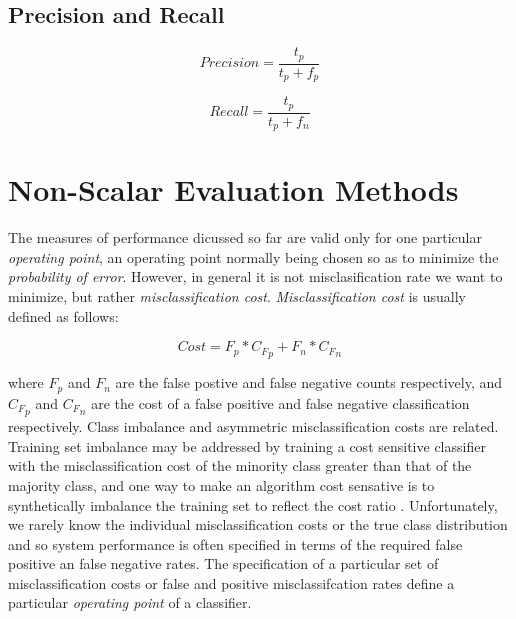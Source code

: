 \documentclass[10pt]{unbthesis}
\begin{document}
\subsection*{Precision and Recall}

\begin{equation}
\label{equ:precision}
Precision = \frac{t_p}{t_p + f_p}
\end{equation}


\begin{equation}
\label{equ:recall}
Recall = \frac{t_p}{t_p + f_n}
\end{equation}

\section*{Non-Scalar Evaluation Methods}
The measures of performance dicussed so far are valid only for one
particular \textit{operating point}, an operating point normally being
chosen so as to minimize the \textit{probability of error}. However,
in general it is not misclasification rate we want to minimize, but
rather \textit{misclassification cost}. \textit{Misclassification
  cost} is usually defined as follows:

\begin{equation}
\label{equ:misclasscost}
Cost = F_p * {C_F}_p + F_n * {C_F}_n
\end{equation}

where \(F_p\) and \(F_n\) are the false postive and false negative
counts respectively, and \({C_F}_p\) and \({C_F}_n\) are the cost of a
false positive and false negative classification respectively. Class
imbalance and asymmetric misclassification costs are related. Training
set imbalance may be addressed by training a cost sensitive classifier
with the misclassification cost of the minority class greater than
that of the majority class, and one way to make an algorithm cost
sensative is to synthetically imbalance the training set to reflect
the cost ratio \cite{RefWorks:52}. Unfortunately, we rarely know the individual
misclassification costs or the true class distribution and so system
performance is often specified in terms of the required false positive
an false negative rates. The specification of a particular set of
misclassification costs or false and positive misclassifcation rates
define a particular \textit{operating point} of a classifier. 
\end{document}
